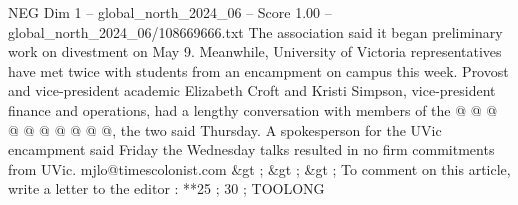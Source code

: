 \begin{textsample}{NEG Dim 1 – global\_north\_2024\_06 – Score 1.00 – global\_north\_2024\_06/108669666.txt}
The association said it began preliminary work on divestment on May 9.
Meanwhile, University of Victoria representatives have met twice with students from an encampment on campus this week.
Provost and vice-president academic Elizabeth Croft and Kristi Simpson, vice-president finance and operations, had a lengthy conversation with members of the @ @ @ @ @ @ @ @ @ @, the two said Thursday.
A spokesperson for the UVic encampment said Friday the Wednesday talks resulted in no firm commitments from UVic. mjlo@timescolonist.com \&gt ; \&gt ; \&gt ; To comment on this article, write a letter to the editor : **25 ; 30 ; TOOLONG

\end{textsample}
